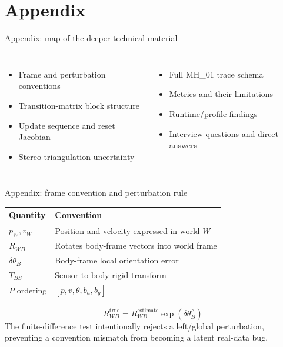 \documentclass[10pt,aspectratio=169]{beamer}
\begin{document}
\appendix
\section{Appendix}

\begin{frame}{Appendix: map of the deeper technical material}
  \begin{columns}[T]
    \begin{itemize}
      \item Frame and perturbation conventions
      \item Transition-matrix block structure
      \item Update sequence and reset Jacobian
      \item Stereo triangulation uncertainty
    \end{itemize}
    \begin{itemize}
      \item Full MH\_01 trace schema
      \item Metrics and their limitations
      \item Runtime/profile findings
      \item Interview questions and direct answers
    \end{itemize}
  \end{columns}
\end{frame}

\begin{frame}{Appendix: frame convention and perturbation rule}
  \begin{tabular}{ll}
    \toprule
    Quantity & Convention \\
    \midrule
    $p_W, v_W$ & Position and velocity expressed in world $W$ \\
    $R_{WB}$ & Rotates body-frame vectors into world frame \\
    $\delta\theta_B$ & Body-frame local orientation error \\
    $T_{BS}$ & Sensor-to-body rigid transform \\
    $P$ ordering & $[p,v,\theta,b_a,b_g]$ \\
    \bottomrule
  \end{tabular}
  \vspace{1em}
  \[
    R_{WB}^{\text{true}} = R_{WB}^{\text{estimate}}\exp(\delta\theta_B^\wedge)
  \]
  The finite-difference test intentionally rejects a left/global perturbation, preventing a convention mismatch from becoming a latent real-data bug.
\end{frame}
\end{document}

